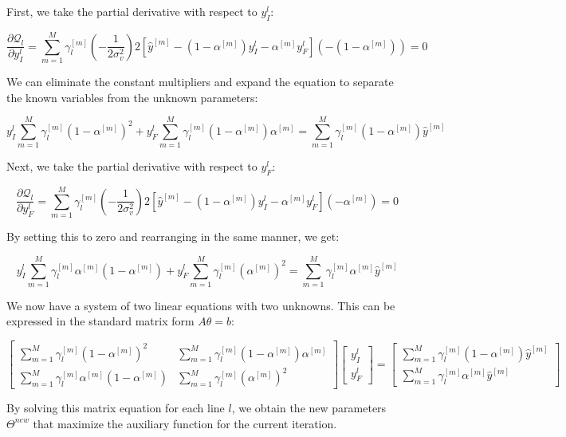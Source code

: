 \documentclass{article}
\begin{document}
First, we take the partial derivative with respect to $y_I^l$:

$$
\frac{\partial \mathcal{Q}_l}{\partial y_I^l} = \sum_{m=1}^{M} \gamma_l^{[m]} \left( -\frac{1}{2\sigma_v^2} \right) 2 \left[ \hat{y}^{[m]} - (1-\alpha^{[m]})y_I^l - \alpha^{[m]}y_F^l \right] (-(1-\alpha^{[m]})) = 0
$$

We can eliminate the constant multipliers and expand the equation to separate the known variables from the unknown parameters:

$$
y_I^l \sum_{m=1}^{M} \gamma_l^{[m]} (1-\alpha^{[m]})^2 + y_F^l \sum_{m=1}^{M} \gamma_l^{[m]} (1-\alpha^{[m]})\alpha^{[m]} = \sum_{m=1}^{M} \gamma_l^{[m]} (1-\alpha^{[m]})\hat{y}^{[m]}
$$

Next, we take the partial derivative with respect to $y_F^l$:

$$
\frac{\partial \mathcal{Q}_l}{\partial y_F^l} = \sum_{m=1}^{M} \gamma_l^{[m]} \left( -\frac{1}{2\sigma_v^2} \right) 2 \left[ \hat{y}^{[m]} - (1-\alpha^{[m]})y_I^l - \alpha^{[m]}y_F^l \right] (-\alpha^{[m]}) = 0
$$

By setting this to zero and rearranging in the same manner, we get:

$$
y_I^l \sum_{m=1}^{M} \gamma_l^{[m]} \alpha^{[m]} (1-\alpha^{[m]}) + y_F^l \sum_{m=1}^{M} \gamma_l^{[m]} (\alpha^{[m]})^2 = \sum_{m=1}^{M} \gamma_l^{[m]} \alpha^{[m]}\hat{y}^{[m]}
$$

We now have a system of two linear equations with two unknowns. This can be expressed in the standard matrix form $A\theta = b$:

$$
\begin{bmatrix} 
\sum_{m=1}^{M} \gamma_l^{[m]} (1-\alpha^{[m]})^2 & \sum_{m=1}^{M} \gamma_l^{[m]} (1-\alpha^{[m]})\alpha^{[m]} \\ 
\sum_{m=1}^{M} \gamma_l^{[m]} \alpha^{[m]} (1-\alpha^{[m]}) & \sum_{m=1}^{M} \gamma_l^{[m]} (\alpha^{[m]})^2 
\end{bmatrix} 
\begin{bmatrix} y_I^l \\ y_F^l \end{bmatrix} = 
\begin{bmatrix} 
\sum_{m=1}^{M} \gamma_l^{[m]} (1-\alpha^{[m]})\hat{y}^{[m]} \\ 
\sum_{m=1}^{M} \gamma_l^{[m]} \alpha^{[m]}\hat{y}^{[m]} 
\end{bmatrix}
$$

By solving this matrix equation for each line $l$, we obtain the new parameters $\Theta^{new}$ that maximize the auxiliary function for the current iteration.
\end{document}
